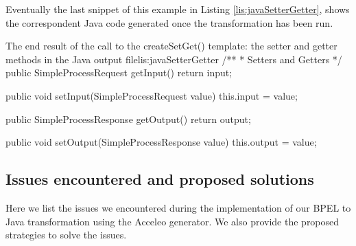 Eventually the last snippet of this example in Listing \ref{lis:javaSetterGetter}, shows the correspondent Java code generated once the transformation has been run.

\begin{center}
  \begin{minipage}{1\textwidth}
    \begin{java-code}{The end result of the call to the createSetGet() template: the setter and getter methods in the Java output file}{lis:javaSetterGetter}
    /**
     * Setters and Getters    
     */
public SimpleProcessRequest getInput() {
	return input;
}

public void setInput(SimpleProcessRequest value) { 
	this.input = value;
}

public SimpleProcessResponse getOutput() {
	return output;
}

public void setOutput(SimpleProcessResponse value) {
	this.output = value;
}	
    \end{java-code}
  \end{minipage}
\end{center}



\subsection{Issues encountered and proposed solutions}
\label{sec:issues}
Here we list the issues we encountered during the implementation of our BPEL to Java transformation using the Acceleo generator. We also provide the proposed strategies to solve the issues.
